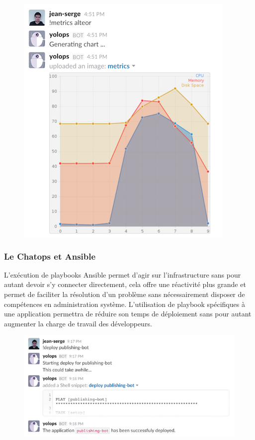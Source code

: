 \documentclass[12pt,a4paper]{article}
\begin{document}
  \begin{figure}[htbp]
  \centering
  \includegraphics{metrics.png}
  \caption{}
  \end{figure}

  \newpage

  \subsubsection{Le Chatops et Ansible}\label{le-chatops-et-ansible}

  L'exécution de playbooks Ansible permet d'agir sur l'infrastructure sans
  pour autant devoir s'y connecter directement, cela offre une réactivité
  plus grande et permet de faciliter la résolution d'un problème sans
  nécessairement disposer de compétences en administration système.
  L'utilisation de playbook spécifiques à une application permettra de
  réduire son temps de déploiement sans pour autant augmenter la charge de
  travail des développeurs.

  \begin{figure}[htbp]
  \centering
  \includegraphics{deploy.png}
  \caption{}
  \end{figure}
\end{document}

